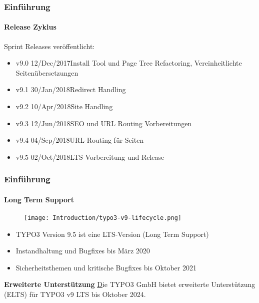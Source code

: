 
\begin{frame}[fragile]
	\frametitle{Einführung}
	\framesubtitle{Release Zyklus}

	Sprint Releases veröffentlicht:

	\begin{itemize}
		\item v9.0 \tabto{1.1cm}12/Dec/2017\tabto{3.4cm}Install Tool und Page Tree Refactoring,\newline
			\tabto{3.4cm}Vereinheitlichte Seitenübersetzungen
		\item v9.1 \tabto{1.1cm}30/Jan/2018\tabto{3.4cm}Redirect Handling
		\item v9.2 \tabto{1.1cm}10/Apr/2018\tabto{3.4cm}Site Handling
		\item v9.3 \tabto{1.1cm}12/Jun/2018\tabto{3.4cm}SEO und URL Routing Vorbereitungen
		\item v9.4 \tabto{1.1cm}04/Sep/2018\tabto{3.4cm}URL-Routing für Seiten
		\item v9.5 \tabto{1.1cm}02/Oct/2018\tabto{3.4cm}LTS Vorbereitung und Release
	\end{itemize}

\end{frame}


\begin{frame}[fragile]
	\frametitle{Einführung}
	\framesubtitle{Long Term Support}

	\begin{figure}
		\texttt{[image: Introduction/typo3-v9-lifecycle.png]}
	\end{figure}

	\begin{itemize}
		\item TYPO3 Version 9.5 ist eine LTS-Version (Long Term Support)
		\item Instandhaltung und Bugfixes bis März 2020
		\item Sicherheitsthemen und kritische Bugfixes bis Oktober 2021
	\end{itemize}
	\vspace{0.2cm}
	\textbf{Erweiterte Unterstützung}\newline
	\smaller
		\href{https://typo3.com} Die {TYPO3 GmbH} bietet erweiterte Unterstützung
			(ELTS) für TYPO3 v9 LTS bis Oktober 2024.
	\normalsize

\end{frame}

